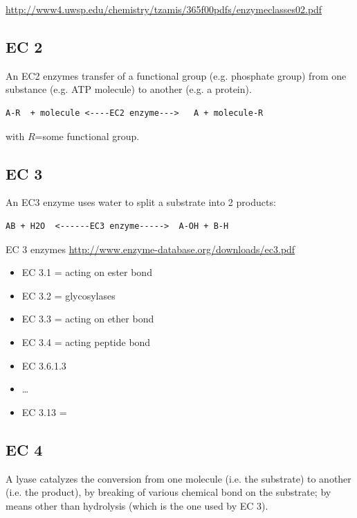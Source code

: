 \url{http://www4.uwsp.edu/chemistry/tzamis/365f00pdfs/enzymeclasses02.pdf}

\subsection{EC 2}
\label{sec:EC_2}


An EC2 enzymes transfer of a functional group (e.g. phosphate group) from one
substance (e.g. ATP molecule) to another (e.g. a protein).
\begin{verbatim}
A-R  + molecule <----EC2 enzyme--->   A + molecule-R
\end{verbatim}
with $R$=some functional group.

\subsection{EC 3}
\label{sec:EC_3}

An EC3 enzyme uses water to split a substrate into 2 products:
\begin{verbatim}
AB + H2O  <------EC3 enzyme----->  A-OH + B-H
\end{verbatim}

EC 3 enzymes \url{http://www.enzyme-database.org/downloads/ec3.pdf}

\begin{itemize}
  \item EC 3.1 = acting on ester bond
  
  \item EC 3.2 = glycosylases
  
  \item EC 3.3 = acting on ether bond
  \item EC 3.4 = acting peptide bond
  
  \item EC 3.6.1.3
  \item \ldots
  \item EC 3.13 = 
  
\end{itemize}

\subsection{EC 4}
\label{sec:EC_4}

A lyase  catalyzes the conversion from one molecule (i.e. the substrate) to
another (i.e. the product), by breaking of various chemical bond on the
substrate; by means other than hydrolysis (which is the one used by EC 3).

